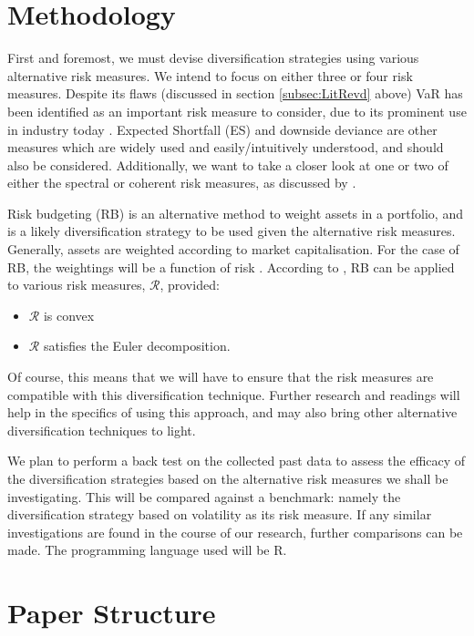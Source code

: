 \documentclass[12pt,a4paper]{article}
\newcommand{\bi}{\begin{itemize}}
\newcommand{\ei}{\end{itemize}}
\begin{document}
\section{Methodology}
\label{sec:Method}

First and foremost, we must devise diversification strategies using various alternative risk measures. We intend to focus on either three or four risk measures. Despite its flaws (discussed in section \ref{subsec:LitRevd} above) VaR has been identified as an important risk measure to consider, due to its prominent use in industry today \citep{consiglirisk}. Expected Shortfall (ES) and downside deviance are other measures which are widely used and easily/intuitively understood, and should also be considered. Additionally, we want to take a closer look at one or two of either the spectral or coherent risk measures, as discussed by \cite{dowd2006after}.

Risk budgeting (RB) is an alternative method to weight assets in a portfolio, and is a likely diversification strategy to be used given the alternative risk measures. Generally, assets are weighted according to market capitalisation. For the case of RB, the weightings will be a function of risk \citep{bruder2012managing}. According to \cite{bruder2012managing}, RB can be applied to various risk measures, $\mathcal{R}$, provided:
\bi
\item $\mathcal{R}$ is convex
\item $\mathcal{R}$ satisfies the Euler decomposition.
\ei 
Of course, this means that we will have to ensure that the risk measures are compatible with this diversification technique. Further research and readings will help in the specifics of using this approach, and may also bring other alternative diversification techniques to light.

We plan to perform a back test on the collected past data to assess the efficacy of the diversification strategies based on the alternative risk measures we shall be investigating. This will be compared against a benchmark: namely the diversification strategy based on volatility as its risk measure. If any similar investigations are found in the course of our research, further comparisons can be made.  The programming language used will be R.

\section{Paper Structure}
\label{sec:struc}
\end{document}
